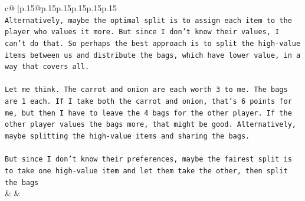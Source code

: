 \documentclass{article}
\begin{document}
{\begin{supertabular}{c@{$\;$}|p{.15\linewidth}@{}p{.15\linewidth}p{.15\linewidth}p{.15\linewidth}p{.15\linewidth}p{.15\linewidth}}
{{{\\ 
\texttt{Alternatively, maybe the optimal split is to assign each item to the player who values it more. But since I don't know their values, I can't do that. So perhaps the best approach is to split the high{-}value items between us and distribute the bags, which have lower value, in a way that covers all.} \\
\\ 
\texttt{Let me think. The carrot and onion are each worth 3 to me. The bags are 1 each. If I take both the carrot and onion, that's 6 points for me, but then I have to leave the 4 bags for the other player. If the other player values the bags more, that might be good. Alternatively, maybe splitting the high{-}value items and sharing the bags.} \\
\\ 
\texttt{But since I don't know their preferences, maybe the fairest split is to take one high{-}value item and let them take the other, then split the bags} \\
            }
        }
    }
    & & \\ \\


\end{supertabular}}
\end{document}
